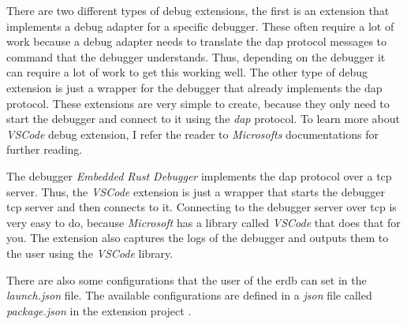 There are two different types of debug extensions, the first is an extension that implements a debug adapter for a specific debugger.
These often require a lot of work because a debug adapter needs to translate the \gls{dap} protocol messages to command that the debugger understands.
Thus, depending on the debugger it can require a lot of work to get this working well.
The other type of debug extension is just a wrapper for the debugger that already implements the \gls{dap} protocol.
These extensions are very simple to create, because they only need to start the debugger and connect to it using the \emph{dap} protocol.
To learn more about \emph{VSCode} debug extension, I refer the reader to \emph{Microsofts} documentations \cite{vscode-debugger-extension-doc} for further reading.


The debugger \emph{Embedded Rust Debugger} implements the \gls{dap} protocol over a \gls{tcp} server.
Thus, the \emph{VSCode} extension is just a wrapper that starts the debugger \gls{tcp} server and then connects to it.
Connecting to the debugger server over \gls{tcp} is very easy to do, because \emph{Microsoft} has a library called \emph{VSCode} that does that for you.
The extension also captures the logs of the debugger and outputs them to the user using the \emph{VSCode} library.


There are also some configurations that the user of the \gls{erdb} can set in the \emph{launch.json} file.
The available configurations are defined in a \emph{json} file called \emph{package.json} in the extension project \cite{erdb-vscode}.
